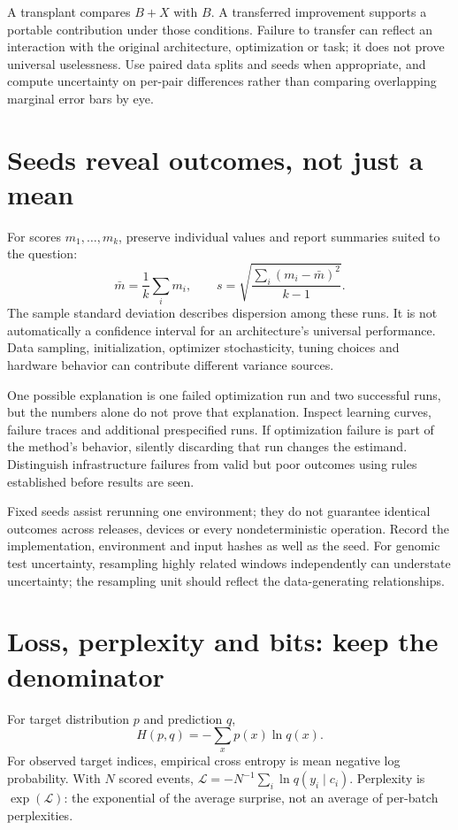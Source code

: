 A transplant compares $B+X$ with $B$. A transferred improvement supports a portable contribution under those conditions. Failure to transfer can reflect an interaction with the original architecture, optimization or task; it does not prove universal uselessness. Use paired data splits and seeds when appropriate, and compute uncertainty on per-pair differences rather than comparing overlapping marginal error bars by eye.

\section{Seeds reveal outcomes, not just a mean}
For scores $m_1,\ldots,m_k$, preserve individual values and report summaries suited to the question:
\[
\bar m=\frac1k\sum_i m_i,\qquad
s=\sqrt{\frac{\sum_i(m_i-\bar m)^2}{k-1}}.
\]
The sample standard deviation describes dispersion among these runs. It is not automatically a confidence interval for an architecture's universal performance. Data sampling, initialization, optimizer stochasticity, tuning choices and hardware behavior can contribute different variance sources.\cite{e2variance}


One possible explanation is one failed optimization run and two successful runs, but the numbers alone do not prove that explanation. Inspect learning curves, failure traces and additional prespecified runs. If optimization failure is part of the method's behavior, silently discarding that run changes the estimand. Distinguish infrastructure failures from valid but poor outcomes using rules established before results are seen.

Fixed seeds assist rerunning one environment; they do not guarantee identical outcomes across releases, devices or every nondeterministic operation.\cite{e2torchrandom} Record the implementation, environment and input hashes as well as the seed. For genomic test uncertainty, resampling highly related windows independently can understate uncertainty; the resampling unit should reflect the data-generating relationships.

\section{Loss, perplexity and bits: keep the denominator}
For target distribution $p$ and prediction $q$,
\[
H(p,q)=-\sum_xp(x)\ln q(x).
\]
For observed target indices, empirical cross entropy is mean negative log probability. With $N$ scored events, $\mathcal L=-N^{-1}\sum_i\ln q(y_i\mid c_i)$. Perplexity is $\exp(\mathcal L)$: the exponential of the average surprise, not an average of per-batch perplexities.

